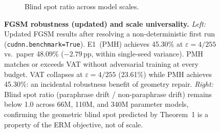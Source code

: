 \begin{figure}[t]
\begin{subfigure}[b]{0.48\textwidth}
\caption{Blind spot ratio across model scales.}
\end{subfigure}
\caption{\textbf{FGSM robustness (updated) and scale universality.}
\emph{Left:} Updated FGSM results after resolving a non-deterministic first run
(\texttt{cudnn.benchmark=True}). E1~(PMH) achieves 45.30\% at $\varepsilon{=}4/255$
vs.\ paper 48.09\% ($-2.79$\,pp, within single-seed variance).
PMH matches or exceeds VAT without adversarial training at every budget.
VAT collapses at $\varepsilon{=}4/255$ (23.61\%) while PMH achieves 45.30\%:
an incidental robustness benefit of geometry repair.
\emph{Right:} Blind spot ratio (paraphrase drift / non-paraphrase drift) remains below 1.0
across 66M, 110M, and 340M parameter models, confirming the geometric blind spot predicted
by Theorem~1 is a property of the ERM objective, not of scale.}
\label{fig:A8}
\end{figure}
